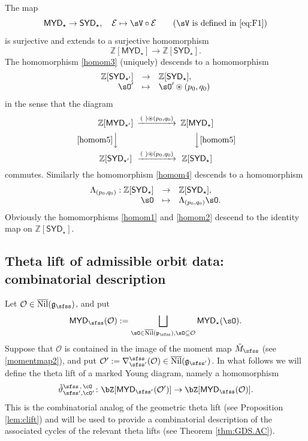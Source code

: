 \documentclass[11pt,a4paper]{amsart}
\def\SYD{{\mathsf{SYD}}}
\def\MYD{{\mathsf{MYD}}}
\newcommand{\CE}{{\mathcal {E}}}
\newcommand{\CO}{{\mathcal {O}}}
\newcommand{\g}{\mathfrak g}
\newcommand{\p}{\mathfrak p}
\newcommand{\Z}{\mathbb{Z}}
\newcommand{\be}{\begin {equation}}
\newcommand{\ee}{\end {equation}}
\numberwithin{equation}{section}
\theoremstyle{remark}
\def\subset{\subseteq}
\def\Nil{\overline{\mathrm{Nil}}}
\def\SYD{{\mathsf{SYD}}}
\def\MYD{{\mathsf{MYD}}}
\begin{document}
The map
\[
  \MYD_{\star}\rightarrow \SYD_\star, \quad \CE\mapsto \sV\circ \CE \qquad (\text{$\sV$ is defined in \eqref{eq:F1}})
\]
is surjective  and extends to a surjective homomorphism
\be\label{homom5}
\Z[\MYD_{\star}]\rightarrow \Z[\SYD_\star].
\ee
The homomorphism \eqref{homom3} (uniquely) descends to a homomorphism
\be\label{homom6}
\begin{array}{rcl}
  \Z[\SYD_{\star'}]&\rightarrow&\Z[\SYD_{\star}], \\
   \sO'&\mapsto &\sO' \circledast (p_0,q_0)
   \end{array}
\ee
in the sense that the diagram
\[
 \begin{CD}
       \Z[\MYD_{\star'}]
                  @>(\,\,) \circledast (p_0,q_0) >>  \Z[\MYD_{\star}]\\
            @V \eqref{homom5}   VV         @ VV  \eqref{homom5}  V \\
      \Z[\SYD_{\star'}]
                  @> (\,\,) \circledast (p_0,q_0) >>  \Z[\SYD_{\star}]\\
  \end{CD}
\]
commutes. Similarly the homomorphism \eqref{homom4} descends to a homomorphism
\be\label{homom7}
\begin{array}{rcl}
  \Lambda_{(p_0,q_0)}: \Z[\SYD_{\star}]&\rightarrow&\Z[\SYD_{\star}], \\
   \sO&\mapsto & \Lambda_{(p_0,q_0)} \sO.
   \end{array}
\ee
Obviously the homomorphisms \eqref{homom1} and \eqref{homom2} descend to the identity map on  $\Z[\SYD_{\star}]$.

\subsection{Theta lift of admissible orbit data: combinatorial description}


\def\cEp{\cE'}
\def\dliftso{{\check \vartheta}_{\sfss',\cO'}^{\sfss\,,\,\cO}}

Let $\CO\in \Nil(\g_\sfss)$, and put
\be\label{MYDs}
  \MYD_\sfss(\CO):=\bigsqcup_{\sO\in \Nil(\p_\sfss), \sO\subset \CO}  \MYD_\star(\sO).
  \ee
  Suppose that $\CO$ is contained in the image of the moment map $\tilde M_{\sfss}$ (see \eqref{momentmap2}), and put $\CO':=\nabla_{\sfss'}^\sfss(\CO)\in \Nil(\g_{\sfss'})$.
In what follows we will define the theta lift of a marked Young diagram, namely a homomorphism
\[
  \dliftso \colon \bZ[\MYD_{\sfss'}(\CO')]\rightarrow \bZ[\MYD_\sfss(\CO)].
\]
This is the combinatorial analog of the geometric theta lift (see Proposition \ref{lem:clift})
and will be used to provide a combinatorial description of the associated cycles of the relevant theta lifts (see Theorem \ref{thm:GDS.AC}).
\end{document}
